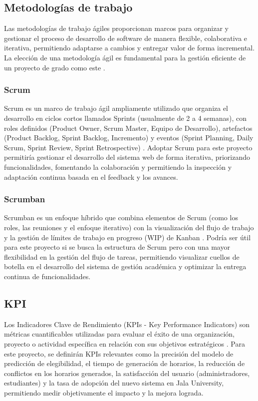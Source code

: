 \subsection{Metodologías de trabajo}
Las metodologías de trabajo ágiles proporcionan marcos para organizar y gestionar el proceso de desarrollo de software de manera flexible, colaborativa e iterativa, permitiendo adaptarse a cambios y entregar valor de forma incremental.
La elección de una metodología ágil es fundamental para la gestión eficiente de un proyecto de grado como este \parencite{Beck2001}.

\subsubsection{Scrum}
Scrum es un marco de trabajo ágil ampliamente utilizado que organiza el desarrollo en ciclos cortos llamados Sprints (usualmente de 2 a 4 semanas), con roles definidos (Product Owner, Scrum Master, Equipo de Desarrollo), artefactos (Product Backlog, Sprint Backlog, Incremento) y eventos (Sprint Planning, Daily Scrum, Sprint Review, Sprint Retrospective) \parencite{SchwaberSutherland2020}.
Adoptar Scrum para este proyecto permitiría gestionar el desarrollo del sistema web de forma iterativa, priorizando funcionalidades, fomentando la colaboración y permitiendo la inspección y adaptación continua basada en el feedback y los avances.

\subsubsection{Scrumban}
Scrumban es un enfoque híbrido que combina elementos de Scrum (como los roles, las reuniones y el enfoque iterativo) con la visualización del flujo de trabajo y la gestión de límites de trabajo en progreso (WIP) de Kanban \parencite{Kniberg2010}.
Podría ser útil para este proyecto si se busca la estructura de Scrum pero con una mayor flexibilidad en la gestión del flujo de tareas, permitiendo visualizar cuellos de botella en el desarrollo del sistema de gestión académica y optimizar la entrega continua de funcionalidades.

\subsection{KPI}
Los Indicadores Clave de Rendimiento (KPIs - Key Performance Indicators) son métricas cuantificables utilizadas para evaluar el éxito de una organización, proyecto o actividad específica en relación con sus objetivos estratégicos \parencite{Parmenter2015}.
Para este proyecto, se definirán KPIs relevantes como la precisión del modelo de predicción de elegibilidad, el tiempo de generación de horarios, la reducción de conflictos en los horarios generados, la satisfacción del usuario (administradores, estudiantes) y la tasa de adopción del nuevo sistema en Jala University, permitiendo medir objetivamente el impacto y la mejora lograda.

